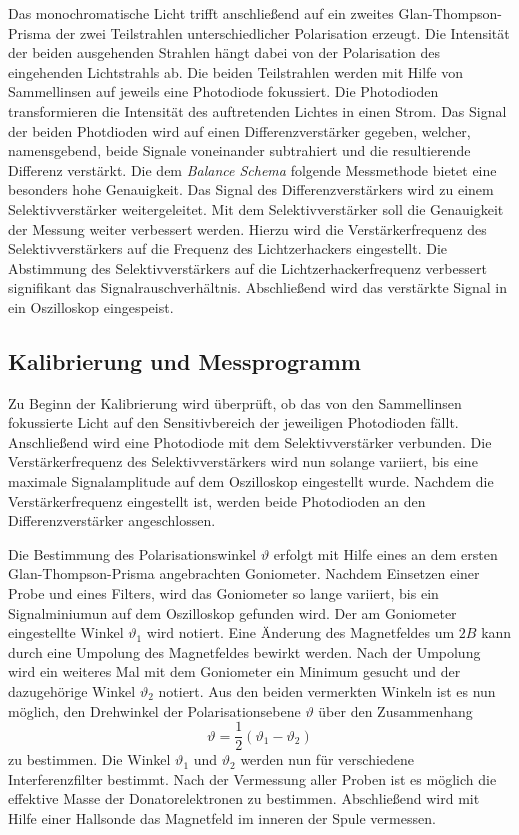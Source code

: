 Das monochromatische Licht trifft anschließend auf ein zweites Glan-Thompson-Prisma
der zwei Teilstrahlen unterschiedlicher Polarisation erzeugt. Die Intensität
der beiden ausgehenden Strahlen hängt dabei von der Polarisation des eingehenden
Lichtstrahls ab. Die beiden Teilstrahlen werden mit Hilfe von Sammellinsen auf
jeweils eine Photodiode fokussiert. Die Photodioden transformieren die
Intensität des auftretenden Lichtes in einen Strom. Das Signal der beiden
Photdioden wird auf einen Differenzverstärker gegeben, welcher, namensgebend,
beide Signale voneinander subtrahiert und die resultierende Differenz verstärkt.
Die dem \emph{Balance Schema} folgende Messmethode bietet eine besonders hohe Genauigkeit.
Das Signal des Differenzverstärkers wird zu einem Selektivverstärker weitergeleitet.
Mit dem Selektivverstärker soll die Genauigkeit der Messung weiter verbessert werden.
Hierzu wird die Verstärkerfrequenz des Selektivverstärkers auf die Frequenz des
Lichtzerhackers eingestellt. Die Abstimmung des Selektivverstärkers auf die
Lichtzerhackerfrequenz verbessert signifikant das Signalrauschverhältnis.
Abschließend wird das verstärkte Signal in ein Oszilloskop eingespeist.

\subsection{Kalibrierung und Messprogramm}
Zu Beginn der Kalibrierung wird überprüft, ob das von den Sammellinsen
fokussierte Licht auf den Sensitivbereich der jeweiligen Photodioden fällt.
Anschließend wird eine Photodiode mit dem Selektivverstärker verbunden.
Die Verstärkerfrequenz des Selektivverstärkers wird nun solange variiert,
bis eine maximale Signalamplitude auf dem Oszilloskop eingestellt wurde.
Nachdem die Verstärkerfrequenz eingestellt ist, werden beide Photodioden
an den Differenzverstärker angeschlossen.

Die Bestimmung des Polarisationswinkel $\vartheta$ erfolgt mit Hilfe eines
an dem ersten Glan-Thompson-Prisma angebrachten Goniometer. Nachdem Einsetzen einer
Probe und eines Filters, wird das Goniometer so lange variiert, bis ein Signalminiumun
auf dem Oszilloskop gefunden wird. Der am Goniometer eingestellte Winkel $\vartheta_1$ wird
notiert. Eine Änderung des Magnetfeldes um $2B$ kann durch eine Umpolung des
Magnetfeldes bewirkt werden. Nach der Umpolung wird ein weiteres Mal mit dem
Goniometer ein Minimum gesucht und der dazugehörige Winkel $\vartheta_2$ notiert.
Aus den beiden vermerkten Winkeln ist es nun möglich, den Drehwinkel der Polarisationsebene
$\vartheta$ über den Zusammenhang
\begin{equation}
  \label{eq:theta_aus_messung}
  \vartheta = \frac{1}{2}(\vartheta_1 - \vartheta_2)
\end{equation}
zu bestimmen. Die Winkel $\vartheta_1$ und $\vartheta_2$ werden nun für verschiedene
Interferenzfilter bestimmt. Nach der Vermessung aller Proben ist es möglich die
effektive Masse der Donatorelektronen zu bestimmen.
Abschließend wird mit Hilfe einer Hallsonde das Magnetfeld im inneren der Spule
vermessen.
\FloatBarrier
